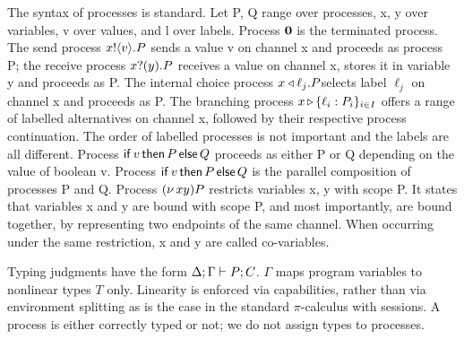 The syntax of processes is standard. Let P, Q range over processes, x, y over variables, v over values, and l over labels. Process $\mathbf{0}$ is the terminated process. The send process $x{}!\langle v\rangle. P$ sends a value v on channel x and proceeds as process P; the receive process ${x}{}?(y). P$ receives a value on channel x, stores it in variable y and proceeds as P. The internal choice process $x\triangleleft \ell_j. P $selects label $\ell_j$ on channel x and proceeds as P. The branching process $x\,{\triangleright}\,\{\ell_i: P_i\}_{i \in I}$ offers a range of labelled alternatives on channel x, followed by their respective process continuation.  The order of labelled processes is not important and the labels are all different. Process $\mathsf{if}\,v\,\mathsf{then}\,P\,\mathsf{else}\,Q$ proceeds as either P or Q depending on the value of boolean v. Process $\mathsf{if}\,v\,\mathsf{then}\,P\,\mathsf{else}\,Q$ is the parallel composition of processes P and Q. Process $(\nu\,xy) P$ restricts variables x, y with scope P. It states that variables x and y are bound with scope P, and most importantly, are bound together, by representing two endpoints of the same channel. When occurring under the same restriction, x and y are called co-variables.


Typing judgments have the form $\Delta; \Gamma \mathrel{\vdash} P; C$.
$\Gamma$ maps program variables to nonlinear types $T$ only. Linearity is enforced via capabilities, rather than via environment splitting as is the case in the standard $\pi$-calculus with sessions. A process is either correctly typed or not; we do not assign types to processes.

